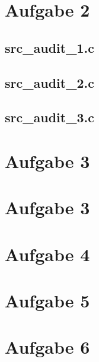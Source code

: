 \documentclass[11pt,a4paper]{article}
\begin{document}
\section{Aufgabe 2}
\subsection{src\_audit\_1.c}
\subsection{src\_audit\_2.c}
\subsection{src\_audit\_3.c}
\section{Aufgabe 3}
\section{Aufgabe 3}
\section{Aufgabe 4}
\section{Aufgabe 5}
\section{Aufgabe 6}
\end{document}
